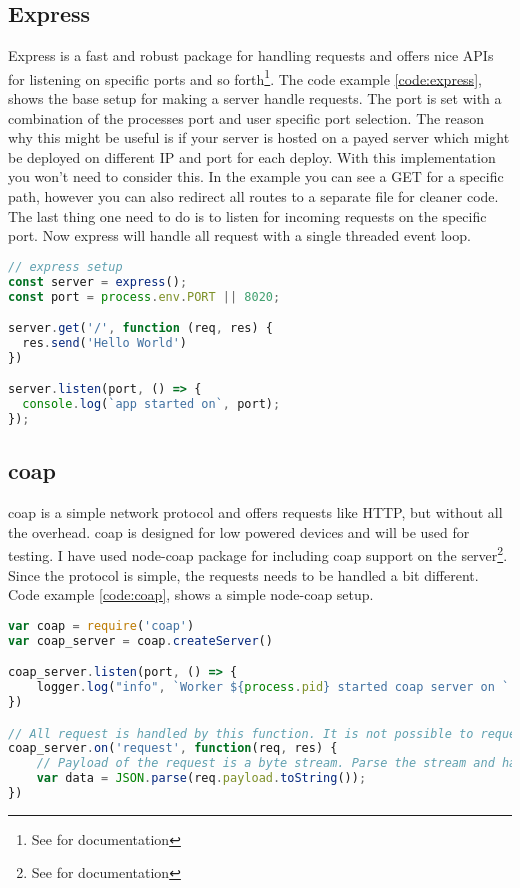 \documentclass[USenglish]{ifimaster}  %
\begin{document}
\subsection{Express}
Express is a fast and robust package for handling requests and offers nice APIs for listening on specific ports and so forth\footnote{See \cite{npm:express} for documentation}. The code example \ref{code:express}, shows the base setup for making a server handle requests. The port is set with a combination of the processes port and user specific port selection. The reason why this might be useful is if your server is hosted on a payed server which might be deployed on different IP and port for each deploy. With this implementation you won't need to consider this. In the example you can see a GET for a specific path, however you can also redirect all routes to a separate file for cleaner code. The last thing one need to do is to listen for incoming requests on the specific port. Now express will handle all request with a single threaded event loop.

\begin{lstlisting}[caption={Base express setup},label={code:express},language=JavaScript]
// express setup
const server = express();
const port = process.env.PORT || 8020;

server.get('/', function (req, res) {
  res.send('Hello World')
})

server.listen(port, () => {
  console.log(`app started on`, port);
});
\end{lstlisting}

\subsection{\acrshort{coap}}
\acrfull{coap} is a simple network protocol and offers requests like HTTP, but without all the overhead. \acrshort{coap} is designed for low powered devices and will be used for testing. I have used node-coap package for including \acrshort{coap} support on the server\footnote{See \cite{npm:coap} for documentation}. Since the protocol is simple, the requests needs to be handled a bit different. Code example \vref{code:coap}, shows a simple node-coap setup.

\begin{lstlisting}[caption={Base \acrshort{coap} setup},label={code:coap},language=JavaScript]
var coap = require('coap')
var coap_server = coap.createServer()

coap_server.listen(port, () => {
    logger.log("info", `Worker ${process.pid} started coap server on ` + port);
})

// All request is handled by this function. It is not possible to request a specific url path
coap_server.on('request', function(req, res) {
    // Payload of the request is a byte stream. Parse the stream and handle the data
    var data = JSON.parse(req.payload.toString());
})
\end{lstlisting}
\end{document}
